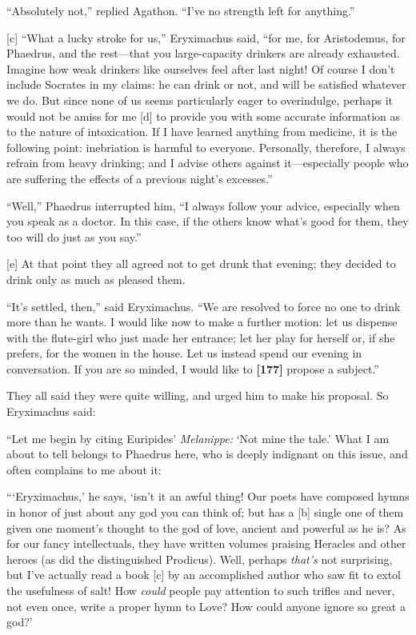 “Absolutely not,” replied Agathon. “I've no strength left for anything.”

{[}c{]} “What a lucky stroke for us,” Eryximachus said, “for me, for
Aristodemus, for Phaedrus, and the rest---that you large-capacity
drinkers are already exhausted. Imagine how weak drinkers like ourselves
feel after last night! Of course I don't include Socrates in my claims:
he can drink or not, and will be satisfied whatever we do. But since
none of us seems particularly eager to overindulge, perhaps it would not
be amiss for me {[}d{]} to provide you with some accurate information as
to the nature of intoxication. If I have learned anything from medicine,
it is the following point: inebriation is harmful to everyone.
Personally, therefore, I always refrain from heavy drinking; and I
advise others against it---especially people who are suffering the
effects of a previous night's excesses.”

“Well,” Phaedrus interrupted him, “I always follow your advice,
especially when you speak as a doctor. In this case, if the others know
what's good for them, they too will do just as you say.”

{[}e{]} At that point they all agreed not to get drunk that evening;
they decided to drink only as much as pleased them.

“It's settled, then,” said Eryximachus. “We are resolved to force no one
to drink more than he wants. I would like now to make a further motion:
let us dispense with the flute-girl who just made her entrance; let her
play for herself or, if she prefers, for the women in the house. Let us
instead spend our evening in conversation. If you are so minded, I would
like to {\bf {[}177{]}} propose a subject.”

They all said they were quite willing, and urged him to make his
proposal. So Eryximachus said:

“Let me begin by citing Euripides' {\em Melanippe:} ‘Not mine the tale.'
What I am about to tell belongs to Phaedrus here, who is deeply
indignant on this issue, and often complains to me about it:

“‘Eryximachus,' he says, ‘isn't it an awful thing! Our poets have
composed hymns in honor of just about any god you can think of; but has
a {[}b{]} single one of them given one moment's thought to the god of
love, ancient and powerful as he is? As for our fancy intellectuals,
they have written volumes praising Heracles and other heroes (as did the
distinguished Prodicus). Well, perhaps {\em that's} not surprising, but
I've actually read a book {[}c{]} by an accomplished author who saw fit
to extol the usefulness of salt! How {\em could} people pay attention to
such trifles and never, not even once, write a proper hymn to Love? How
could anyone ignore so great a god?'

